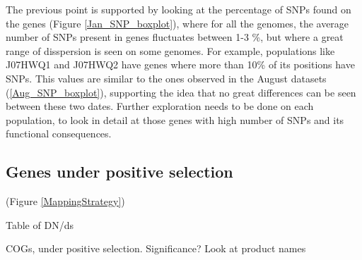 The previous point is supported by looking at the percentage of SNPs found on the genes (Figure \ref{Jan_SNP_boxplot}), where for all the genomes, the average number of SNPs present in genes fluctuates between 1-3 \%, but where a great range of disspersion is seen on some genomes. For example, populations like J07HWQ1 and J07HWQ2 have genes where more than 10\% of its positions have SNPs. This values are similar to the ones observed in the August datasets (\ref{Aug_SNP_boxplot}), supporting the idea that no great differences can be seen between these two dates. Further exploration needs to be done on each population, to look in detail at those genes with high number of SNPs and its functional consequences.

\subsection{Genes under positive selection}

(Figure \ref{MappingStrategy})



Table of DN/ds

COGs, under positive selection. Significance?
Look at product names



